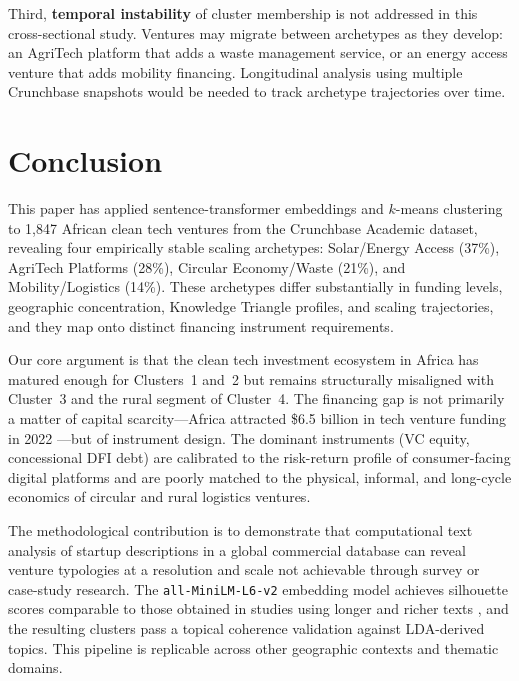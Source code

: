 \documentclass[review,12pt]{elsarticle}
\begin{document}
Third, \textbf{temporal instability} of cluster membership is not
addressed in this cross-sectional study. Ventures may migrate between
archetypes as they develop: an AgriTech platform that adds a waste
management service, or an energy access venture that adds mobility
financing. Longitudinal analysis using multiple Crunchbase snapshots
would be needed to track archetype trajectories over time.


\section{Conclusion}
\label{sec:conclusion}

This paper has applied sentence-transformer embeddings and $k$-means
clustering to 1,847 African clean tech ventures from the Crunchbase
Academic dataset, revealing four empirically stable scaling
archetypes: Solar/Energy Access (37\%), AgriTech Platforms (28\%),
Circular Economy/Waste (21\%), and Mobility/Logistics (14\%). These
archetypes differ substantially in funding levels, geographic
concentration, Knowledge Triangle profiles, and scaling trajectories,
and they map onto distinct financing instrument requirements.

Our core argument is that the clean tech investment ecosystem in
Africa has matured enough for Clusters~1 and~2 but remains
structurally misaligned with Cluster~3 and the rural segment of
Cluster~4. The financing gap is not primarily a matter of capital
scarcity---Africa attracted \$6.5 billion in tech venture funding in
2022 \citep{cbinsights2023africa}---but of instrument design. The
dominant instruments (VC equity, concessional DFI debt) are
calibrated to the risk-return profile of consumer-facing digital
platforms and are poorly matched to the physical, informal, and
long-cycle economics of circular and rural logistics ventures.

The methodological contribution is to demonstrate that computational
text analysis of startup descriptions in a global commercial database
can reveal venture typologies at a resolution and scale not achievable
through survey or case-study research. The \texttt{all-MiniLM-L6-v2}
embedding model achieves silhouette scores comparable to those
obtained in studies using longer and richer texts
\citep{grimmer2021machine}, and the resulting clusters pass a topical
coherence validation against LDA-derived topics. This pipeline is
replicable across other geographic contexts and thematic domains.
\end{document}
